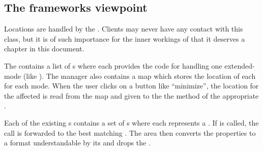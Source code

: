 
\subsection{The frameworks viewpoint} \label{sec:clocationmodemanager}
Locations are handled by the . Clients may never have any contact with this class, but it is of such importance for the inner workings of  that it deserves a chapter in this document.

The  contains a list of s where each  provides the code for handling one extended-mode (like \linebreak {}). The manager also contains a map which stores the location of each  for each mode. When the user clicks on a button like ``minimize'', the location for the affected  is read from the map and given to the the  method of the appropriate .

Each of the existing s contains a set of s where each  represents a . If  is called, the call is forwarded to the best matching . The area then converts the properties to a format understandable by its  and drops the .

